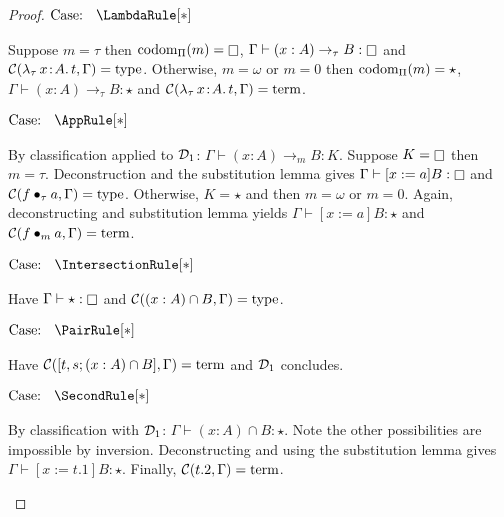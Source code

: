 \begin{proof}
    $\text{Case: }\begin{array}{c} \LambdaRule[*] \end{array}$
    \begin{proofcase}
        Suppose $m = \tau$ then $\pcodom(m) = \kind$, $\Gamma \vdash (x : A) \to_\tau B : \kind$ and $\mathcal{C}({\lambda_\tau}\, x\! : \! A.\, t, \Gamma) = \mbox{\normalfont type}$.
        Otherwise, $m = \omega$ or $m = 0$ then $\mbox{\normalfont codom}_\Pi(m) = \star$, $\Gamma \vdash (x : A) \to_\tau B : \star$ and $\mathcal{C}({\lambda_\tau}\, x\! : \! A.\, t, \Gamma) = \mbox{\normalfont term}$.
    \end{proofcase}

    $\text{Case: }\begin{array}{c} \AppRule[*] \end{array}$
    \begin{proofcase}
        By classification applied to $\mathcal{D}_{1}$: $\Gamma \vdash (x : A) \to_m B : K$.
        Suppose $K = \kind$ then $m = \tau$.
        Deconstruction and the substitution lemma gives $\Gamma \vdash [x := a]B : \kind$ and $\mathcal{C}(f \bullet_{\tau} a, \Gamma) = \mbox{\normalfont type}$.
        Otherwise, $K = \star$ and then $m = \omega$ or $m = 0$.
        Again, deconstructing and substitution lemma yields $\Gamma \vdash [x := a]B : \star$ and $\mathcal{C}(f \bullet_{m} a, \Gamma) = \mbox{\normalfont term}$.
    \end{proofcase}

    $\text{Case: }\begin{array}{c} \IntersectionRule[*] \end{array}$
    \begin{proofcase}
        Have $\Gamma \vdash \star : \kind$ and $\mathcal{C}((x : A) \cap B, \Gamma) = \mbox{\normalfont type}$.
    \end{proofcase}

    $\text{Case: }\begin{array}{c} \PairRule[*] \end{array}$
    \begin{proofcase}
        Have $\mathcal{C}([t, s; (x : A) \cap B], \Gamma) = \mbox{\normalfont term}$ and $\mathcal{D}_{1}$ concludes.
    \end{proofcase}

    $\text{Case: }\begin{array}{c} \SecondRule[*] \end{array}$
    \begin{proofcase}
        By classification with $\mathcal{D}_{1}$: $\Gamma \vdash (x : A) \cap B : \star$.
        Note the other possibilities are impossible by inversion.
        Deconstructing and using the substitution lemma gives $\Gamma \vdash [x := t.1]B : \star$.
        Finally, $\mathcal{C}(t.2, \Gamma) = \mbox{\normalfont term}$.
    \end{proofcase}


\end{proof}
